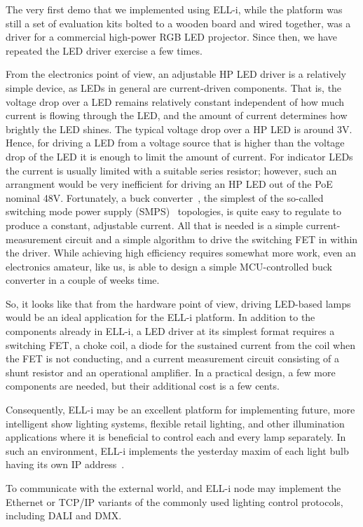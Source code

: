 \documentclass[draft,a4paper]{siamltex}
\begin{document}
The very first demo that we implemented using ELL-i, while the
platform was still a set of evaluation kits bolted to a wooden board
and wired together, was a driver for a commercial high-power RGB LED
projector.  Since then, we have repeated the LED driver exercise a few
times.

From the electronics point of view, an adjustable HP LED driver is a
relatively simple device, as LEDs in general are current-driven
components.  That is, the voltage drop over a LED remains relatively
constant independent of how much current is flowing through the LED,
and the amount of current determines how brightly the LED shines.  The
typical voltage drop over a HP LED is around 3V.  Hence, for driving a
LED from a voltage source that is higher than the voltage drop of the
LED it is enough to limit the amount of current.  For indicator LEDs
the current is usually limited with a suitable series resistor;
however, such an arrangment would be very inefficient for driving an
HP LED out of the PoE nominal 48V.  Fortunately, a buck
converter~\cite{buck-converter}, the simplest of the so-called
switching mode power supply (SMPS)~\cite{SMPS} topologies, is quite
easy to regulate to produce a constant, adjustable current.  All that
is needed is a simple current-measurement circuit and a simple
algorithm to drive the switching FET in within the driver.  While
achieving high efficiency requires somewhat more work, even an
electronics amateur, like us, is able to design a simple
MCU-controlled buck converter in a couple of weeks time.

So, it looks like that from the hardware point of view, driving
LED-based lamps would be an ideal application for the ELL-i platform.
In addition to the components already in ELL-i, a LED driver at its
simplest format requires a switching FET, a choke coil, a diode for
the sustained current from the coil when the FET is not conducting,
and a current measurement circuit consisting of a shunt resistor and
an operational amplifier.  In a practical design, a few more
components are needed, but their additional cost is a few cents.

Consequently, ELL-i may be an excellent platform for implementing
future, more intelligent show lighting systems, flexible retail
lighting, and other illumination applications where it is beneficial
to control each and every lamp separately.  In such an environment,
ELL-i implements the yesterday maxim of each light bulb having its own
IP address~\cite{lightbulb}.

To communicate with the external world, and ELL-i node may implement
the Ethernet or TCP/IP variants of the commonly used lighting control
protocols, including DALI\cite{DALI} and DMX\cite{DMX}.
\end{document}
